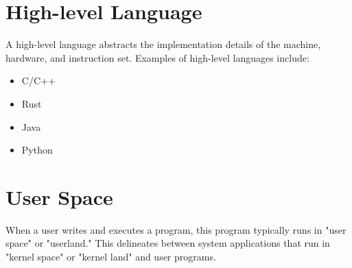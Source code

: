\documentclass[pdftex,10pt]{article}
\begin{document}
\section{High-level Language}

A high-level language abstracts the implementation details of the machine, hardware, and instruction set. Examples of high-level languages include:

\begin{itemize}
    \item C/C++
    \item Rust
    \item Java
    \item Python
\end{itemize}

\section{User Space}

When a user writes and executes a program, this program typically runs in "user space" or "userland." This delineates between system applications that run in "kernel space" or "kernel land" and user programs.
\end{document}
